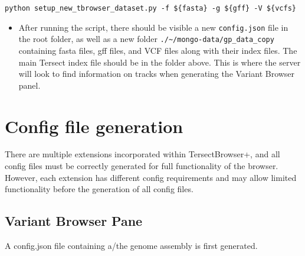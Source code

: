 \documentclass[12pt]{article}
\begin{document}
\begin{enumerate}
      \verb+python setup_new_tbrowser_dataset.py -f ${fasta} -g ${gff} -V ${vcfs}+
      \begin{itemize}
          \item After running the script, there should be visible a new \verb+config.json+ file in the root folder, as well as a new folder \verb+./~/mongo-data/gp_data_copy+ containing fasta files, gff files, and VCF files along with their index files. The main Tersect index file should be in the folder above. This is where the server will look to find information on tracks when generating the Variant Browser panel.
      \end{itemize}
\end{enumerate}

\section{Config file generation}
There are multiple extensions incorporated within TersectBrowser+, and all config files must be correctly generated for full functionality of the browser. However, each extension has different config requirements and may allow limited functionality before the generation of all config files.

\subsection{Variant Browser Pane}
A config.json file containing a/the genome assembly is first generated. 
\end{document}
